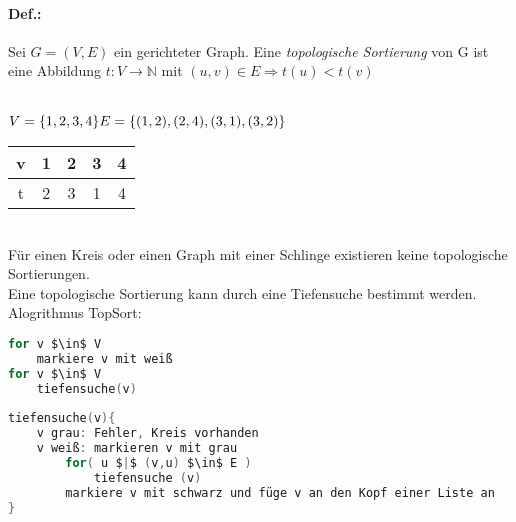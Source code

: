 \paragraph{Def.:} Sei $G=(V,E)$ ein gerichteter Graph. Eine \emph{topologische Sortierung} von G ist eine Abbildung $t: V\rightarrow \mathbb{N} $ mit $ (u,v) \in E \Rightarrow t(u) < t(v)$\\
\\
$V= \{1,2,3,4\}\\
E=\{(1,2), (2,4), (3,1), (3,2)\}
$\\
\begin{tabular}{c | c c c c}
v & 1 & 2 & 3 & 4 \\
\hline
t & 2 & 3 & 1 & 4
\end{tabular}\medskip\\
Für einen Kreis oder einen Graph mit einer Schlinge existieren keine topologische Sortierungen.\medskip\\
Eine topologische Sortierung kann durch eine Tiefensuche bestimmt werden.\\
Alogrithmus TopSort:
\begin{lstlisting}[language=C]
for v $\in$ V
	markiere v mit weiß
for v $\in$ V
	tiefensuche(v)
	
tiefensuche(v){
	v grau: Fehler, Kreis vorhanden
	v weiß: markieren v mit grau
		for( u $|$ (v,u) $\in$ E )
			tiefensuche (v)
		markiere v mit schwarz und füge v an den Kopf einer Liste an
}
\end{lstlisting}
